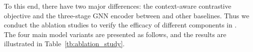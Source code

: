 
  








 To this end, there have two major differences: the context-aware contrastive objective and the three-stage GNN encoder between \smodel and other baselines. Thus we conduct the ablation studies to verify the efficacy of different components in \model.  The four main model variants are presented as follows, and the results are illustrated in Table~\ref{tb:ablation_study}. 


